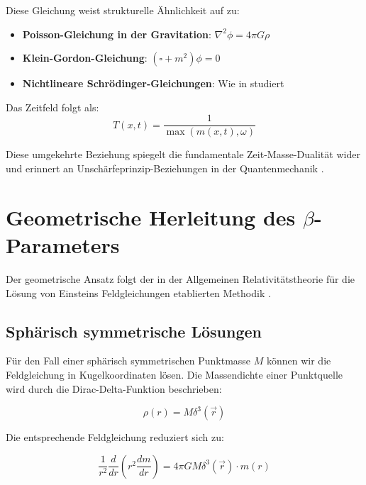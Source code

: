 \documentclass[12pt,a4paper]{article}
\begin{document}
	Diese Gleichung weist strukturelle Ähnlichkeit auf zu:
	\begin{itemize}
		\item \textbf{Poisson-Gleichung in der Gravitation}: $\nabla^2 \phi = 4\pi G \rho$ \citep{jackson1998}
		\item \textbf{Klein-Gordon-Gleichung}: $(\square + m^2)\phi = 0$ \citep{peskin1995}
		\item \textbf{Nichtlineare Schrödinger-Gleichungen}: Wie in \citep{sulem1999} studiert
	\end{itemize}
	
	Das Zeitfeld folgt als:
	\begin{equation}
		\label{eq:time_field_definition}
		T(x,t) = \frac{1}{\max(m(x,t), \omega)}
	\end{equation}
	
	Diese umgekehrte Beziehung spiegelt die fundamentale Zeit-Masse-Dualität wider und erinnert an Unschärfeprinzip-Beziehungen in der Quantenmechanik \citep{heisenberg1927,griffiths2004}.
	
	\section{Geometrische Herleitung des $\beta$-Parameters}
	\label{sec:beta_derivation}
	
	Der geometrische Ansatz folgt der in der Allgemeinen Relativitätstheorie für die Lösung von Einsteins Feldgleichungen etablierten Methodik \citep{schwarzschild1916,misner1973,carroll2004}.
	

\subsection{Sphärisch symmetrische Lösungen}
\label{subsec:spherical_solutions}

Für den Fall einer sphärisch symmetrischen Punktmasse $M$ können wir die Feldgleichung in Kugelkoordinaten lösen. Die Massendichte einer Punktquelle wird durch die Dirac-Delta-Funktion beschrieben:

\begin{equation}
	\rho(r) = M \delta^3(\vec{r})
\end{equation}

Die entsprechende Feldgleichung reduziert sich zu:

\begin{equation}
	\frac{1}{r^2} \frac{d}{dr}\left(r^2 \frac{dm}{dr}\right) = 4\pi G M \delta^3(\vec{r}) \cdot m(r)
\end{equation}
\end{document}
